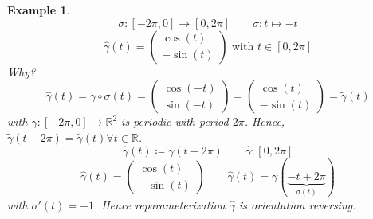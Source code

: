 \documentclass{article}
\newtheorem{example}{Example}  \numberwithin{example}{section}
\begin{document}
\begin{example}
  \[ \sigma: [-2\pi, 0] \to [0, 2\pi] \qquad \sigma: t \mapsto -t \]
  \[ \hat\gamma(t) = \begin{pmatrix} \cos(t) \\ -\sin(t) \end{pmatrix} \text{ with } t \in [0,2\pi] \]
  Why?
  \[ \hat\gamma(t) = \gamma \circ \sigma(t) = \begin{pmatrix} \cos(-t) \\ \sin(-t) \end{pmatrix} = \begin{pmatrix} \cos(t) \\ -\sin(t) \end{pmatrix} = \tilde\gamma(t) \]
  with $\tilde\gamma: [-2\pi, 0] \to \mathbb R^2$ is periodic with period $2\pi$.
  Hence, $\tilde\gamma(t - 2\pi) = \tilde\gamma(t) \forall t \in \mathbb R$.
  \[ \hat\gamma(t) \coloneqq \tilde\gamma(t - 2\pi) \qquad \hat\gamma: [0, 2\pi] \]
  \[ \hat{\gamma}(t) = \begin{pmatrix} \cos(t) \\ -\sin(t) \end{pmatrix} \qquad \hat{\gamma}(t) = \gamma(\underbrace{-t + 2\pi}_{\sigma(t)}) \]
  with $\sigma'(t) = -1$. Hence reparameterization $\hat\gamma$ is orientation reversing.
\end{example}
\end{document}
